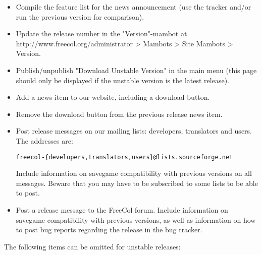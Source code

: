 \documentclass[12pt]{book}
\begin{document}
\begin{itemize}
\begin{verbatim}
#!/bin/sh

FREECOL_VERSION=0.9.0-alpha2
PREFIX=freecol-$FREECOL_VERSION
USERNAME=myUserName

cd dist

sftp $USERNAME,freecol@frs.sourceforge.net <<FILE
cd /home/frs/project/f/fr/freecol/freecol
mkdir $PREFIX
cd $PREFIX
put $PREFIX-installer.exe
put $PREFIX-installer.jar
put $PREFIX-installer-with-sources.jar
put $PREFIX-mac.tar.bz2
put $PREFIX-src.tar.gz
put $PREFIX-src.zip
put $PREFIX.tar.gz
put $PREFIX.zip
exit
FILE
\end{verbatim}

\item Compile the feature list for the news announcement (use the tracker
  and/or run the previous version for comparison).

\item Update the release number in the "Version"-mambot at
  http://www.freecol.org/administrator > Mambots > Site Mambots > Version.

\item Publish/unpublish "Download Unstable Version" in the main menu
  (this page should only be displayed if the unstable version is the
  latest release).

\item Add a news item to our website, including a download button.

\item Remove the download button from the previous release news item.

\item Post release messages on our mailing lists: developers,
  translators and users.  The addresses are:

\verb+freecol-{developers,translators,users}@lists.sourceforge.net+

Include information on savegame compatibility with previous versions
on all messages.  Beware that you may have to be subscribed to some
lists to be able to post.

\item Post a release message to the FreeCol forum. Include information
  on savegame compatibility with previous versions, as well as
  information on how to post bug reports regarding the release in the
  bug tracker.

\end{itemize}

The following items can be omitted for unstable releases:
\end{document}
